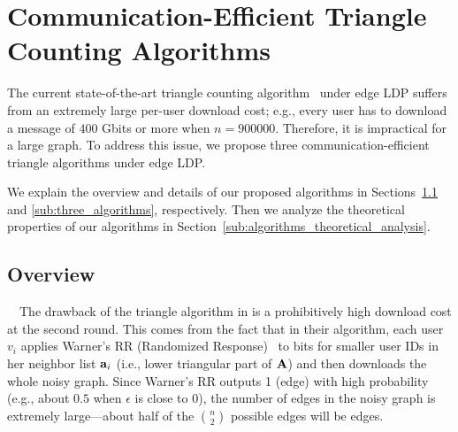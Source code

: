 \section{Communication-Efficient Triangle Counting Algorithms}
\label{sec:algorithms}
The current state-of-the-art triangle counting algorithm~\cite{Imola_USENIX21} under edge LDP suffers from an extremely large per-user download cost; 
e.g., every user has to download a message of $400$ Gbits or more when $n=900000$. 
Therefore, it is impractical for a large graph. 
To address this issue, we propose three communication-efficient triangle algorithms under edge LDP.

We explain the overview and details of our proposed algorithms in Sections~\ref{sub:algorithms_overview} and \ref{sub:three_algorithms}, respectively.
Then we analyze the theoretical properties of our algorithms in Section~\ref{sub:algorithms_theoretical_analysis}.

\subsection{Overview}
\label{sub:algorithms_overview}


{}~~The drawback of the triangle algorithm in \cite{Imola_USENIX21} is a prohibitively 
high 
download cost at the second round.
This comes from the fact that
in their algorithm, 
each user $v_i$ applies Warner's RR
(Randomized Response)~\cite{Warner_JASA65} to
bits for smaller user IDs in her neighbor list $\mathbf{a}_i$ (i.e., lower triangular part of $\mathbf{A}$)
and then downloads the whole noisy graph.
Since Warner's RR outputs 1 (edge) with high probability (e.g., about $0.5$ when $\epsilon$ is close to $0$), the
number of edges in the noisy graph is extremely large---about half of the $\binom{n}{2}$ possible edges will be edges.

